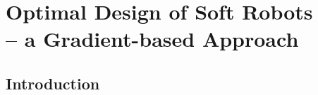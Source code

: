 \chapter[Design Optimization]{Optimal Design of Soft Robots \\ -- a Gradient-based Approach}
\label{chap: chapter 2}




\section{Introduction} \label{sec: chap1 1_introduction}


%
